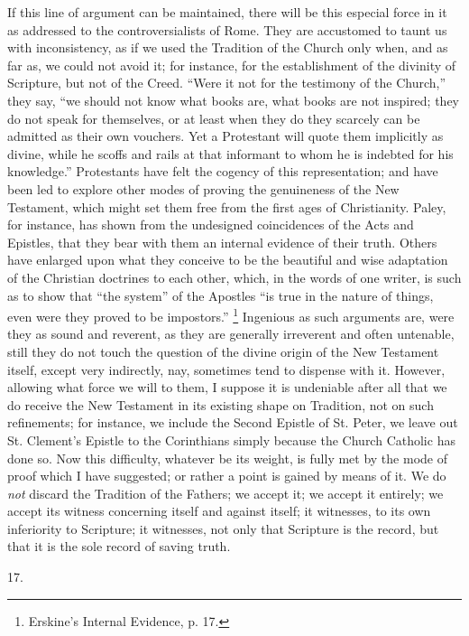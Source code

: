 If this line of argument can be maintained, there will be this
especial force in it as addressed to the controversialists of Rome.
They are accustomed to taunt us with inconsistency, as if we used the
Tradition of the Church only when, and as far as, we could not avoid
it; for instance, for the establishment of the divinity of Scripture,
but not of the Creed. ``Were it not for the testimony of the
Church,'' they say, ``we should not know what books are, what
books are not inspired; they do not speak for themselves, or at least
when they do they scarcely can be admitted as their own vouchers. Yet
a Protestant will quote them implicitly as divine, while he scoffs and
rails at that informant to whom he is indebted for his
knowledge.'' Protestants have felt the cogency of this
representation; and have been led to explore other modes of proving
the genuineness of the New Testament, which might set them free from
the first ages of Christianity. Paley, for instance, has shown from
the undesigned coincidences of the Acts and Epistles, that they bear
with them an internal evidence of their truth. Others have enlarged
upon what they conceive to be the beautiful and wise adaptation of the
Christian doctrines to each other, which, in the words of one writer,
is such as to show that ``the system'' of the Apostles
``is true in the nature of things, even were they proved to be
impostors.'' \footnote{Erskine's Internal Evidence, p. 17.}
Ingenious as such arguments are, were they as sound and reverent, as
they are generally irreverent and often untenable, still they do not
touch the question of the divine origin of the New Testament itself,
except very indirectly, nay, sometimes tend to dispense with it.
However, allowing what force we will to them, I suppose it is
undeniable after all that we do receive the New Testament in its
existing shape on Tradition, not on such refinements; for instance, we
include the Second Epistle of St. Peter, we leave out St. Clement's
Epistle to the Corinthians simply because the Church Catholic has done
so. Now this difficulty, whatever be its weight, is fully met by the
mode of proof which I have suggested; or rather a point is gained by
means of it. We do \emph{not} discard the Tradition of the Fathers; we
accept it; we accept it entirely; we accept its witness concerning
itself and against itself; it witnesses, to its own inferiority to
Scripture; it witnesses, not only that Scripture is the record, but
that it is the sole record of saving truth.

17.

